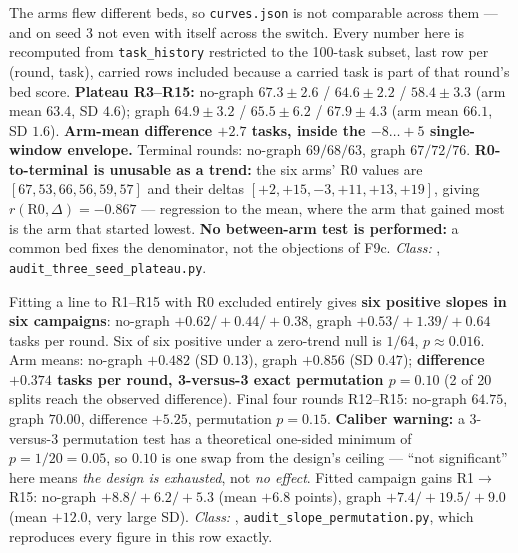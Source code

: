 \begin{description}[leftmargin=0pt,labelindent=0pt,labelsep=0pt,style=nextline,font=\normalfont,itemsep=6pt]
\item[\textbf{F46}\quad Three seeds $\times$ two arms on one bed.]
The arms flew different beds, so \texttt{curves.json} is not comparable
across them --- and on seed 3 not even with itself across the switch. Every
number here is recomputed from \texttt{task\_history} restricted to the
100-task subset, last row per (round, task), carried rows included because
a carried task is part of that round's bed score. \textbf{Plateau R3--R15:}
no-graph $67.3 \pm 2.6$ / $64.6 \pm 2.2$ / $58.4 \pm 3.3$ (arm mean
$63.4$, SD $4.6$); graph $64.9 \pm 3.2$ / $65.5 \pm 6.2$ / $67.9 \pm 4.3$
(arm mean $66.1$, SD $1.6$). \textbf{Arm-mean difference $+2.7$ tasks,
inside the $-8\ldots{+}5$ single-window envelope.} Terminal rounds:
no-graph $69/68/63$, graph $67/72/76$. \textbf{R0-to-terminal is unusable
as a trend:} the six arms' R0 values are $[67, 53, 66, 56, 59, 57]$ and
their deltas $[+2, +15, -3, +11, +13, +19]$, giving
$r(\text{R0}, \Delta) = -0.867$ --- regression to the mean, where the arm
that gained most is the arm that started lowest. \textbf{No between-arm
test is performed:} a common bed fixes the denominator, not the objections
of F9c. \emph{Class:} , \texttt{audit\_three\_seed\_plateau.py}.

\item[\textbf{F47}\quad Within-campaign trend --- both arms climb.]
Fitting a line to R1--R15 with R0 excluded entirely gives \textbf{six
positive slopes in six campaigns}: no-graph $+0.62 / +0.44 / +0.38$, graph
$+0.53 / +1.39 / +0.64$ tasks per round. Six of six positive under a
zero-trend null is $1/64$, $p \approx 0.016$. Arm means: no-graph $+0.482$
(SD $0.13$), graph $+0.856$ (SD $0.47$); \textbf{difference $+0.374$ tasks
per round, 3-versus-3 exact permutation $p = 0.10$} (2 of 20 splits reach
the observed difference). Final four rounds R12--R15: no-graph $64.75$,
graph $70.00$, difference $+5.25$, permutation $p = 0.15$.
\textbf{Caliber warning:} a 3-versus-3 permutation test has a theoretical
one-sided minimum of $p = 1/20 = 0.05$, so $0.10$ is one swap from the
design's ceiling --- ``not significant'' here means \emph{the design is
exhausted}, not \emph{no effect}. Fitted campaign gains R1$\to$R15:
no-graph $+8.8/+6.2/+5.3$ (mean $+6.8$ points), graph $+7.4/+19.5/+9.0$
(mean $+12.0$, very large SD). \emph{Class:} , \texttt{audit\_slope\_permutation.py}, which
reproduces every figure in this row exactly.


\end{description}
